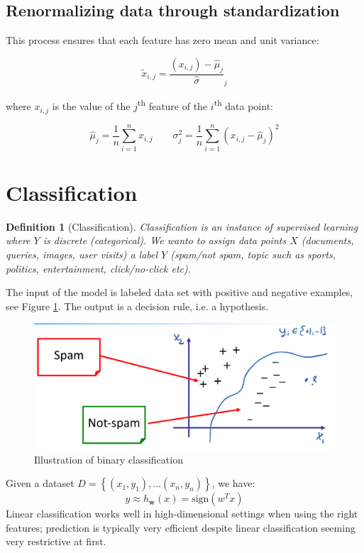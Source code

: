 \documentclass[a4paper,10pt,twoside]{article}
\newtheorem{definition}{Definition}[section]
\begin{document}
\subsection{Renormalizing data through standardization}
This process ensures that each feature has zero mean and unit variance:

\begin{equation*}
    \tilde{x}_{i,j}=\frac{(x_{i,j})-\hat{\mu}_{j}}{\hat{\sigma}}_j
\end{equation*}

where $x_{i,j}$ is the value of the $j$\textsuperscript{th} feature of the $i$\textsuperscript{th} data point:

\begin{equation*}
    \hat{\mu}_j=\frac{1}{n}\sum_{i=1}^{n}x_{i,j} \qquad \sigma_j^2 = \frac{1}{n}\sum_{i=1}^{n}(x_{i,j}-\hat{\mu}_j)^2
\end{equation*}

\section{Classification}
\begin{definition}[Classification]
    Classification is an instance of supervised learning where $Y$ is discrete (categorical). We wanto to assign data points $X$ (documents, queries, images, user visits) a label $Y$ (spam/not spam, topic such as sports, politics, entertainment, click/no-click etc).
\end{definition}

The input of the model is labeled data set with positive and negative examples, see Figure \ref{binary_classification}. The output is a decision rule, i.e. a hypothesis.
\begin{figure}[htbp]
    \centering
    \includegraphics[width=.5\textwidth]{figures/binary_classification.png}
    \caption{Illustration of binary classification}
    \label{binary_classification}
\end{figure}
Given a dataset $D=\left\{(x_1, y_1), \ldots(x_n, y_n)\right\}$, we have:
\begin{equation*}
    y\approx h_{\mathbf{w}}(x)= \text{sign}(w^Tx)
\end{equation*}
Linear classification works well in high-dimensional settings when using the right features; prediction is typically very efficient despite linear classification seeming very restrictive at first.
\end{document}

